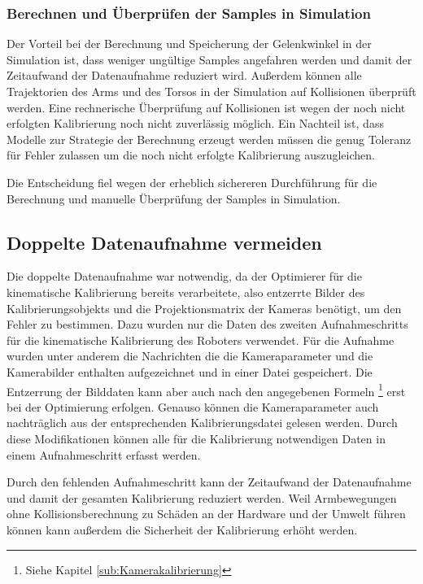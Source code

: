 \subsubsection{Berechnen und Überprüfen der Samples in Simulation}
\label{ssub:Berechnen und Überprüfen der Samples in Simulation}

Der Vorteil bei der Berechnung und Speicherung der
Gelenkwinkel in der Simulation ist, dass weniger ungültige Samples angefahren werden
und damit der Zeitaufwand der Datenaufnahme reduziert wird. Außerdem können alle
Trajektorien des Arms und des Torsos in der Simulation auf Kollisionen überprüft
werden. Eine rechnerische Überprüfung auf Kollisionen ist wegen der noch nicht 
erfolgten Kalibrierung noch nicht zuverlässig möglich. Ein Nachteil ist, dass
Modelle zur Strategie der Berechnung erzeugt werden müssen die genug Toleranz für Fehler zulassen um die 
noch nicht erfolgte Kalibrierung auszugleichen.

Die Entscheidung fiel wegen der erheblich sichereren Durchführung für die Berechnung
und manuelle Überprüfung der Samples in Simulation. 



\subsection{Doppelte Datenaufnahme vermeiden}
\label{sub:Doppelte Datenaufnahme vermeiden}

Die doppelte Datenaufnahme war notwendig, da der Optimierer für die kinematische
Kalibrierung bereits verarbeitete, also entzerrte Bilder des
Kalibrierungsobjekts und die Projektionsmatrix der Kameras benötigt, um den Fehler
zu bestimmen. Dazu wurden nur die Daten des zweiten Aufnahmeschritts für die 
kinematische Kalibrierung des Roboters verwendet. Für die Aufnahme wurden unter
anderem die Nachrichten die die Kameraparameter und die Kamerabilder enthalten
aufgezeichnet und in einer Datei gespeichert. Die Entzerrung der Bilddaten kann
aber auch nach den angegebenen Formeln \footnote{Siehe Kapitel \ref{sub:Kamerakalibrierung}} erst bei
der Optimierung erfolgen. Genauso können die Kameraparameter auch nachträglich
aus der entsprechenden Kalibrierungsdatei gelesen werden. Durch diese Modifikationen
können alle für die Kalibrierung notwendigen Daten in einem Aufnahmeschritt 
erfasst werden.

Durch den fehlenden Aufnahmeschritt kann der Zeitaufwand der Datenaufnahme 
und damit der gesamten Kalibrierung reduziert werden.
Weil Armbewegungen ohne Kollisionsberechnung zu Schäden an der Hardware und der
Umwelt führen können kann außerdem die Sicherheit der Kalibrierung erhöht werden.

